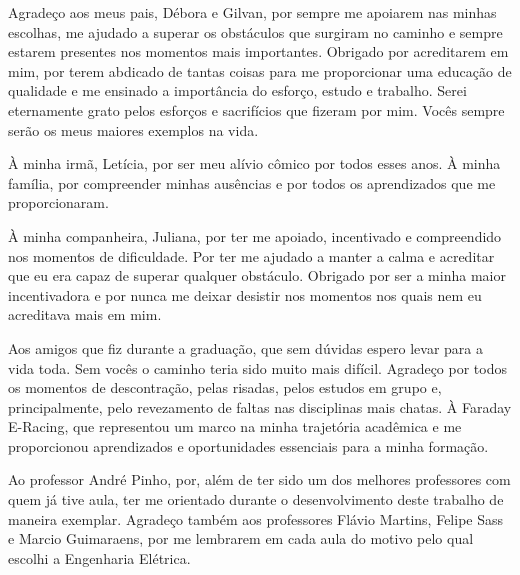 \begin{agradecimentos}
\sloppy	

Agradeço aos meus pais, Débora e Gilvan, por sempre me apoiarem nas minhas escolhas, me ajudado a superar os obstáculos 
que surgiram no caminho e sempre estarem presentes nos momentos mais importantes. Obrigado por acreditarem em mim, por 
terem abdicado de tantas coisas para me proporcionar uma educação de qualidade e me ensinado a importância do esforço, 
estudo e trabalho. Serei eternamente grato pelos esforços e sacrifícios que fizeram por mim. Vocês sempre serão os meus 
maiores exemplos na vida.

À minha irmã, Letícia, por ser meu alívio cômico por todos esses anos. À minha família, por compreender minhas ausências
e por todos os aprendizados que me proporcionaram.

À minha companheira, Juliana, por ter me apoiado, incentivado e compreendido nos momentos de dificuldade. Por ter me 
ajudado a manter a calma e acreditar que eu era capaz de superar qualquer obstáculo. Obrigado por ser a
minha maior incentivadora e por nunca me deixar desistir nos momentos nos quais nem eu acreditava mais em mim.

Aos amigos que fiz durante a graduação, que sem dúvidas espero levar para a vida toda. Sem vocês o caminho teria sido
muito mais difícil. Agradeço por todos os momentos de descontração, pelas risadas, pelos estudos em grupo e, 
principalmente, pelo revezamento de faltas nas disciplinas mais chatas. À Faraday E-Racing, que representou um marco
na minha trajetória acadêmica e me proporcionou aprendizados e oportunidades essenciais para a minha formação.

Ao professor André Pinho, por, além de ter sido um dos melhores professores com quem já tive aula, ter me orientado 
durante o desenvolvimento deste trabalho de maneira exemplar. Agradeço também aos professores Flávio Martins, Felipe 
Sass e Marcio Guimaraens, por me lembrarem em cada aula do motivo pelo qual escolhi a Engenharia Elétrica. 

\end{agradecimentos}